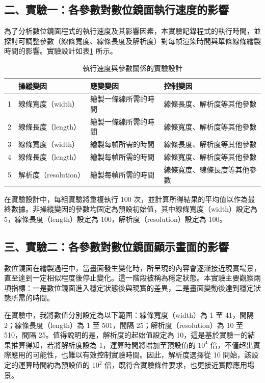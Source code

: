 \documentclass[12pt]{article}
\begin{document}
\subsection{二、實驗一：各參數對數位鏡面執行速度的影響}

為了分析數位鏡面程式的執行速度及其影響因素，本實驗記錄程式的執行時間，並探討可調整參數（線條寬度、線條長度及解析度）對每幀渲染時間與單條線條繪製時間的影響。實驗設計如表\ref{table:sc1_des} 所示。

\begin{table}[h]
  \centering
  \caption{執行速度與參數關係的實驗設計}\label{table:sc1_des}
  \begin{tabular}{p{0.2cm}p{3.5cm}p{4.5cm}p{6cm}}
    \toprule
      & 操縱變因 & 應變變因 & 控制變因 \\ 
    \midrule
    1 & 線條寬度（width） & 繪製一條線所需的時間 & 線條長度、解析度等其他參數 \\ 
    2 & 線條長度（length） & 繪製一條線所需的時間 & 線條寬度、解析度等其他參數 \\ 
    3 & 線條寬度（width） & 繪製每幀所需的時間 & 線條長度、解析度等其他參數 \\ 
    4 & 線條長度（length） & 繪製每幀所需的時間 & 線條寬度、解析度等其他參數 \\ 
    5 & 解析度（resolution） & 繪製每幀所需的時間 & 線條寬度、線條長度等其他參數 \\ 
    \bottomrule
  \end{tabular}
\end{table}

在實驗設計中，每組實驗將重複執行 100 次，並計算所得結果的平均值以作為最終數據。非操縱變因的參數均固定為預設初始值，其中線條寬度（width）設定為 5，線條長度（length）設定為 100，解析度（resolution）設定為 100。

\subsection{三、實驗二：各參數對數位鏡面顯示畫面的影響}

數位鏡面在繪製過程中，當畫面發生變化時，所呈現的內容會逐漸接近現實場景，直至達到一定相似程度後停止變化。這一階段被稱為穩定狀態。本實驗主要觀察兩項指標：一是數位鏡面進入穩定狀態後與現實的差異，二是畫面變動後達到穩定狀態所需的時間。

在實驗中，我將數值分別設定為以下範圍：線條寬度（width）為 1 至 41，間隔 2；線條長度（length）為 1 至 501，間隔 25；解析度（resolution）為 10 至 510，間隔 25。值得說明的是，解析度的起始值設定為 10，這是基於實驗一的結果推算得知，若將解析度設為 1，運算時間將增加至預設值的 $10^4$ 倍，不僅超出實際應用的可能性，也難以有效控制實驗時間。因此，解析度選擇從 10 開始，該設定的運算時間約為預設值的 $10^2$ 倍，既符合實驗條件要求，也更接近實際應用場景。
\end{document}

